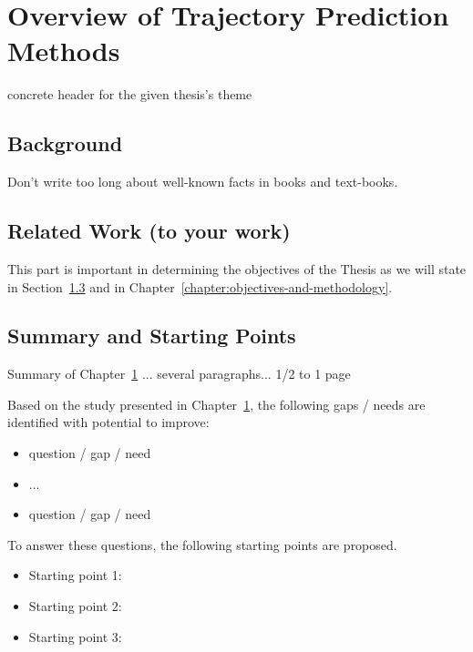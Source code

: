 \chapter{Overview of Trajectory Prediction Methods}
\label{chapter:sota}

concrete header for the given thesis's theme

\section{Background}
\label{sec:sota-background}

Don't write too long about well-known facts in books and text-books.


\section{Related Work (to your work)}
\label{sec:sota-related}

This part is important in determining the objectives of the Thesis as we will state in Section~\ref{sec:sota-summary} and in Chapter~\ref{chapter:objectives-and-methodology}.


\section{Summary and Starting Points}
\label{sec:sota-summary}


Summary of Chapter~\ref{chapter:sota} ... several paragraphs... 1/2 to 1 page

Based on the study presented in Chapter~\ref{chapter:sota}, the following gaps / needs are identified with potential to improve:
\begin{itemize}
    \item question /  gap / need
    \item ...
    \item question /  gap / need
\end{itemize}


To answer these questions, the following starting points are proposed.
\begin{itemize}
    \item Starting point 1:
    \item Starting point 2:
    \item Starting point 3:
\end{itemize}

